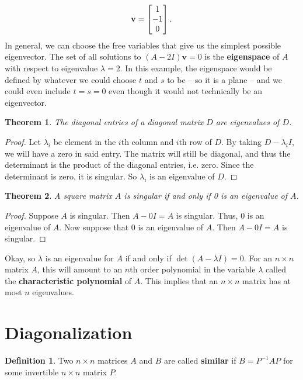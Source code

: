 \documentclass[12pt]{article}
\renewcommand{\vec}[1]{\mathbf{#1}}
\newtheorem{theorem}{Theorem}
\theoremstyle{definition}
\newtheorem{definition}{Definition}
\begin{document}
\begin{example}
	\[
		\vec{v} =
		\begin{bmatrix}
			1 \\ -1 \\ 0
		\end{bmatrix}. \qedhere
	\]
In general, we can choose the free variables that give us the simplest possible eigenvector. The set of all solutions to $(A - 2I)\vec{v}=0$ is the \textbf{eigenspace} of $A$ with respect to eigenvalue $\lambda =2$. In this example, the eigenspace would be defined by whatever we could choose $t$ and $s$ to be -- so it is a plane -- and we could even include $t=s=0$ even though it would not technically be an eigenvector.
\end{example}

\begin{theorem}
	The diagonal entries of a diagonal matrix $D$ are eigenvalues of $D$.
\end{theorem}
\begin{proof}
	Let $\lambda_i$ be element in the $i$th column and $i$th row of $D$. By taking $D - \lambda _i I$, we will have a zero in said entry. The matrix will still be diagonal, and thus the determinant is the product of the diagonal entries, i.e. zero. Since the determinant is zero, it is singular. So $\lambda _i$ is an eigenvalue of $D$. 
\end{proof}

\begin{theorem}
	A square matrix $A$ is singular if and only if 0 is an eigenvalue of $A$. 
\end{theorem}
\begin{proof}
	Suppose $A$ is singular. Then $A - 0I = A$ is singular. Thus, 0 is an eigenvalue of $A$. Now suppose that 0 is an eigenvalue of $A$. Then $A - 0I = A$ is singular. 
\end{proof}

Okay, so $\lambda$ is an eigenvalue for $A$ if and only if $\det(A - \lambda I)=0$. For an $n \times n$ matrix $A$, this will amount to an $n$th order polynomial  in the variable $\lambda $ called the \textbf{characteristic polynomial} of $A$. This implies that an $n \times n$ matrix has at most $n$ eigenvalues. 



\section{Diagonalization}

\begin{definition}
	Two $n \times n$ matrices $A$ and $B$ are called \textbf{similar} if $B = P^{-1}AP$ for some invertible $n \times n$ matrix $P$.
\end{definition}
\end{document}
